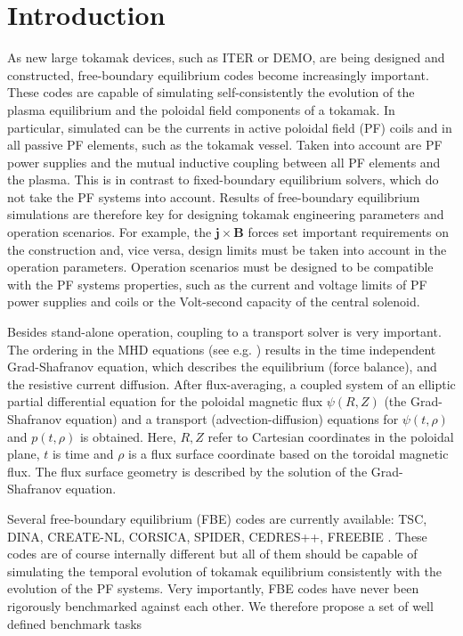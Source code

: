 
\section{Introduction} %
\label{sec:intro}

As new large tokamak devices, such as ITER or DEMO, are being designed and constructed, free-boundary equilibrium codes become increasingly important. These codes are capable of simulating self-consistently the evolution of the plasma equilibrium and the poloidal field components of a tokamak. In particular, simulated can be the currents in active poloidal field (PF) coils and in all passive PF elements, such as the tokamak vessel. Taken into account are PF power supplies and the mutual inductive coupling between all PF elements and the plasma. This is in contrast to fixed-boundary equilibrium solvers, which do not take the PF systems into account. Results of free-boundary equilibrium simulations are therefore key for designing tokamak engineering parameters and operation scenarios. For example, the ${\mathbf{j}} \times {\mathbf{B}}$ forces set important requirements on the construction and, vice versa, design limits must be taken into account in the operation parameters. Operation scenarios must be designed to be compatible with the PF systems properties, such as the current and voltage limits of PF power supplies and coils or the Volt-second capacity of the central solenoid.

Besides stand-alone operation, coupling to a transport solver is very important. The ordering in the MHD equations (see e.g. \cite{Jardin2011}) results in the time independent Grad-Shafranov equation, which describes the equilibrium (force balance), and the resistive current diffusion. After flux-averaging, a coupled system of an elliptic partial differential equation for the poloidal magnetic flux $\psi\left( R,Z \right)$ (the Grad-Shafranov equation) and a transport (advection-diffusion) equations for $\psi\left( t,\rho \right)$ and $p\left( t,\rho \right)$ is obtained. Here, $R,Z$ refer to Cartesian coordinates in the poloidal plane, $t$ is time and $\rho$ is a flux surface coordinate based on the toroidal magnetic flux. The flux surface geometry is described by the solution of the Grad-Shafranov equation. 

Several free-boundary equilibrium (FBE) codes are currently available: TSC, DINA, CREATE-NL, CORSICA, SPIDER, CEDRES++, FREEBIE \cite{FREEBIERef}. These codes are of course internally different but all of them should be capable of simulating the temporal evolution of tokamak equilibrium consistently with the evolution of the PF systems. Very importantly, FBE codes have never been rigorously benchmarked against each other. We therefore propose a set of well defined benchmark tasks



